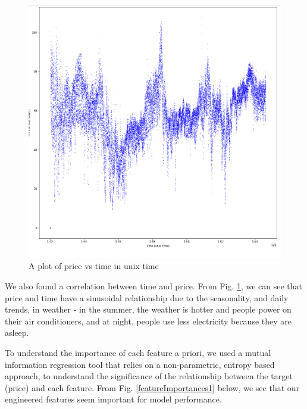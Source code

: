 \documentclass[10pt]{article}
\begin{document}
\begin{figure}[ht]
    \centering
    \includegraphics[scale=0.68]{graph2.png}
    \caption{A plot of price vs time in unix time}
    \label{priceVsTemp}
\end{figure}

We also found a correlation between time and price. From Fig. \ref{priceVsTemp}, we can see that price and time have a sinusoidal relationship due to the seasonality, and daily trends, in weather - in the summer, the weather is hotter and people power on their air conditioners, and at night, people use less electricity because they are asleep. 

To understand the importance of each feature a priori, we used a mutual information regression tool that relies on a non-parametric, entropy based approach, to understand the significance of the relationship between the target (price) and each feature.  From Fig. \ref{featureImportances1} below, we see that our engineered features seem important for model performance.
\end{document}

